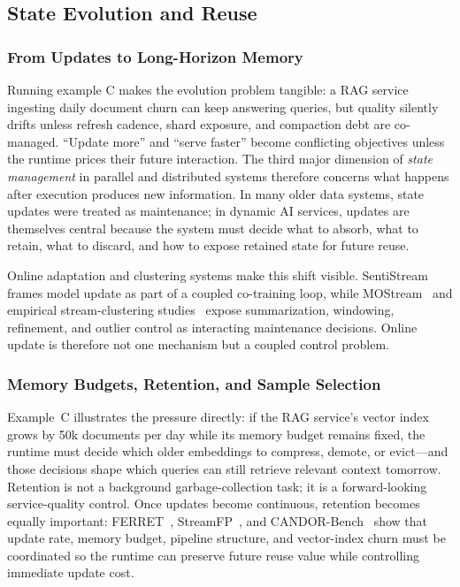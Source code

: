 \documentclass[manuscript]{acmart}
\begin{document}
\subsection{State Evolution and Reuse}

\subsubsection{From Updates to Long-Horizon Memory}

Running example C makes the evolution problem tangible: a RAG service ingesting daily document churn can keep answering queries, but quality silently drifts unless refresh cadence, shard exposure, and compaction debt are co-managed. ``Update more'' and ``serve faster'' become conflicting objectives unless the runtime prices their future interaction. The third major dimension of \emph{state management} in parallel and distributed systems therefore concerns what happens after execution produces new information. In many older data systems, state updates were treated as maintenance; in dynamic AI services, updates are themselves central because the system must decide what to absorb, what to retain, what to discard, and how to expose retained state for future reuse.

Online adaptation and clustering systems make this shift visible. SentiStream~\cite{wu2023sentistream} frames model update as part of a coupled co-training loop, while MOStream~\cite{wang2024mostream} and empirical stream-clustering studies~\cite{wang2023dscstudy} expose summarization, windowing, refinement, and outlier control as interacting maintenance decisions. Online update is therefore not one mechanism but a coupled control problem.

\subsubsection{Memory Budgets, Retention, and Sample Selection}

Example~C illustrates the pressure directly: if the RAG service's vector index grows by 50k documents per day while its memory budget remains fixed, the runtime must decide which older embeddings to compress, demote, or evict---and those decisions shape which queries can still retrieve relevant context tomorrow. Retention is not a background garbage-collection task; it is a forward-looking service-quality control. Once updates become continuous, retention becomes equally important: FERRET~\cite{zhou2025ferret}, StreamFP~\cite{li2026streamfp}, and CANDOR-Bench~\cite{wang2026candor} show that update rate, memory budget, pipeline structure, and vector-index churn must be coordinated so the runtime can preserve future reuse value while controlling immediate update cost.
\end{document}
